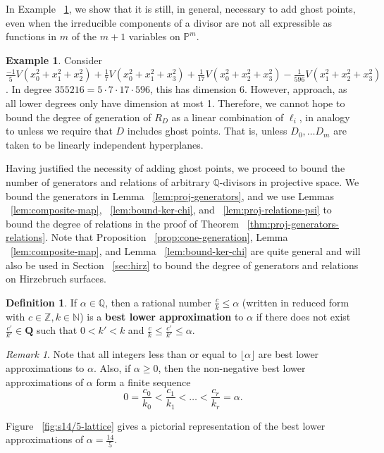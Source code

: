 \documentclass{amsart}
\theoremstyle{plain}
\theoremstyle{definition}
\newtheorem{defn}[thm]{Definition}
\newtheorem{example}[thm]{Example}
\theoremstyle{remark}
\newtheorem{rem}[thm]{Remark}
\numberwithin{equation}{section}
\newcommand\bn{{\mathbb N}}
\newcommand\bq{{\mathbb Q}}
\newcommand\bp{{\mathbb P}}
\newcommand\bz{{\mathbb Z}}
\begin{document}
In Example ~\ref{eg:radical}, we show that it is still, in general,
necessary to add ghost points, even when the irreducible components
of a divisor are not all
expressible as functions in $m$ of the $m+1$ variables on $\bp^m$.

\begin{example}
\label{eg:radical}
Consider $\frac{-1}{5}V(x_0^2 + x_1^2 + x_2^2) + \frac{1}{7}V(x_0^2 + x_1^2 +
x_3^2) + \frac{1}{17}V(x_0^2 + x_2^2 + x_3^2) - \frac{1}{596}V(x_1^2 + x_2^2 +
x_3^2)$. In degree $355216 = 5 \cdot 7 \cdot 17 \cdot 596$, this has dimension
$6$.
However,  approach, as all lower degrees only have
dimension at most 1. Therefore, we cannot hope to bound the degree
of generation of $R_D$ as a linear combination of $\ell_i$,
in analogy to \cite[Theorem 8]{dorney:canonical}
unless we require that $D$ includes ghost points. That is, unless
$D_0,\ldots D_m$ are taken to be linearly independent hyperplanes.
\end{example}

Having justified the necessity of adding ghost points, we proceed to bound the
number of generators and relations of arbitrary $\bq$-divisors in 
projective space. We bound the generators in Lemma ~\ref{lem:proj-generators}, and we use Lemmas ~\ref{lem:composite-map}, ~\ref{lem:bound-ker-chi}, and ~\ref{lem:proj-relations-psi} to bound the 
degree of relations in the proof of Theorem ~\ref{thm:proj-generators-relations}. Note that Proposition ~\ref{prop:cone-generation}, Lemma ~\ref{lem:composite-map}, and Lemma ~\ref{lem:bound-ker-chi} are quite 
general and will also be used in Section ~\ref{sec:hirz} to bound the 
degree of generators and relations on Hirzebruch surfaces.

\begin{defn}
\label{defn:lower-approximation}
If $\alpha \in \bq$, then a rational number $\frac{c}{k} \leq \alpha$
(written in reduced form with $c \in \bz, k \in \bn$) is a
\textbf{best lower approximation} to $\alpha$ if there does not
exist $\frac{c'}{k'}\in \mathbf{Q}$ such that $0 < k'< k$ and
$\frac{c}{k} \le \frac{c'}{k'} \le \alpha$. 
\end{defn}

\begin{rem}
\label{rem:lower-approximation}
Note that all integers less than or equal to $\lfloor \alpha \rfloor$
are best lower approximations to $\alpha$. Also, if $\alpha \ge 0$,
then the non-negative best lower approximations of
$\alpha$ form a finite sequence
\[
	0 = \frac{c_0}{k_0} < \frac{c_1}{k_1} < \ldots < \frac{c_r}{k_r} = \alpha.
\]

\noindent
Figure ~\ref{fig:s14/5-lattice} gives a pictorial representation of the best lower approximations of $\alpha = \frac{14}{5}$.
\end{rem}
\end{document}
